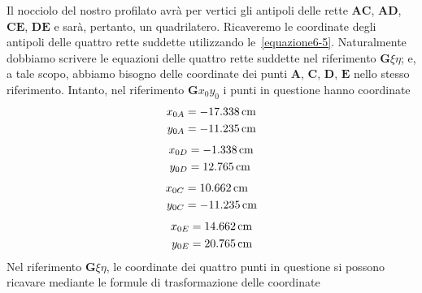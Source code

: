 Il nocciolo del nostro profilato avrà per vertici gli antipoli delle rette $\mathbf{A}\mathbf{C}$, $\mathbf{A}\mathbf{D}$, $\mathbf{C}\mathbf{E}$, $\mathbf{D}\mathbf{E}$ e sarà, pertanto, un quadrilatero.
Ricaveremo le coordinate degli antipoli delle quattro rette suddette utilizzando le~\eqref{equazione6-5}. Naturalmente dobbiamo scrivere le equazioni delle quattro rette suddette nel riferimento $\mathbf{G}\xi\eta$; e, a tale scopo, abbiamo bisogno delle coordinate dei punti $\mathbf{A}$, $\mathbf{C}$, $\mathbf{D}$, $\mathbf{E}$ nello stesso riferimento. Intanto, nel riferimento $\mathbf{G}x_{0}y_{0}$ i punti in questione hanno coordinate
\begin{align*}
x_{0A} &= -17.338\,\textup{cm} \\ 
y_{0A} &= -11.235\,\textup{cm} 
\end{align*}
\begin{align*}
x_{0D} &= -1.338\,\textup{cm} \\ 
y_{0D} &= 12.765\,\textup{cm} 
\end{align*}
\begin{align*}
x_{0C} &= 10.662\,\textup{cm} \\ 
y_{0C} &= -11.235\,\textup{cm} 
\end{align*}
\begin{align*}
x_{0E} &= 14.662\,\textup{cm} \\ 
y_{0E} &= 20.765\,\textup{cm} 
\end{align*}
Nel riferimento $\mathbf{G}\xi\eta$, le coordinate dei quattro punti in questione si possono ricavare mediante le formule di trasformazione delle coordinate

